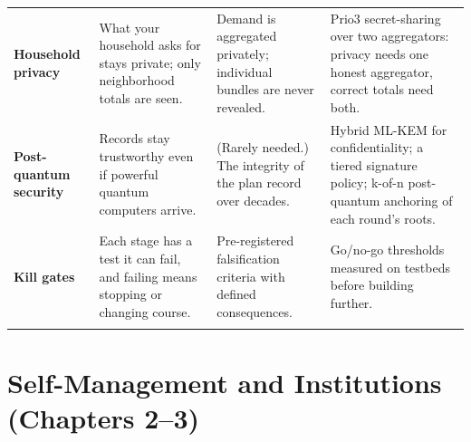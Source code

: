 \documentclass[10pt,twoside,openany]{book}
\theoremstyle{dpepstyle}
\begin{document}
{\begin{longtable}{L{0.72in} L{1.3in} L{1.3in} L{1.3in}}
\textbf{Household privacy} & What your household asks for stays private; only neighborhood totals are seen. & Demand is aggregated privately; individual bundles are never revealed. & Prio3 secret-sharing over two aggregators: privacy needs one honest aggregator, correct totals need both. \\ \addlinespace[2pt]
\textbf{Post-quantum security} & Records stay trustworthy even if powerful quantum computers arrive. & (Rarely needed.) The integrity of the plan record over decades. & Hybrid ML-KEM for confidentiality; a tiered signature policy; k-of-n post-quantum anchoring of each round's roots. \\ \addlinespace[2pt]
\textbf{Kill gates} & Each stage has a test it can fail, and failing means stopping or changing course. & Pre-registered falsification criteria with defined consequences. & Go/no-go thresholds measured on testbeds before building further. \\ \addlinespace[2pt]
\end{longtable}}


\section*{Self-Management and Institutions (Chapters 2--3)}
\end{document}

